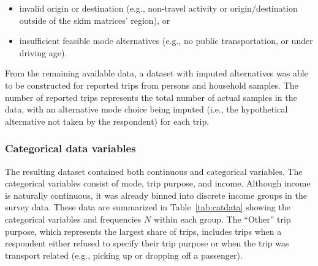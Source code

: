 \documentclass[numbered]{trbunofficial}\usepackage[]{graphicx}\usepackage[]{color}
\begin{document}
\begin{itemize}[leftmargin=0.25in, topsep=3pt, itemsep=1pt, parsep=1pt]
  \item invalid origin or destination (e.g., non-travel activity or origin/destination outside of the skim matrices' region), or
  \item insufficient feasible mode alternatives (e.g., no public transportation, or under driving age).
\end{itemize}

From the remaining available data, a dataset with imputed alternatives was able to be constructed for  reported trips from  persons and  household samples. The number of reported trips represents the total number of actual samples in the data, with an alternative mode choice being imputed (i.e., the hypothetical alternative not taken by the respondent) for each trip. 

\subsubsection{Categorical data variables}
The resulting dataset contained both continuous and categorical variables. The categorical variables consist of mode, trip purpose, and income. Although income is naturally continuous, it was already binned into discrete income groups in the survey data. These data are summarized in Table~\ref{tab:catdata} showing the categorical variables and frequencies $N$ within each group. The ``Other'' trip purpose, which represents the largest share of trips, includes trips when a respondent either refused to specify their trip purpose or when the trip was transport related (e.g., picking up or dropping off a passenger). 
\end{document}
